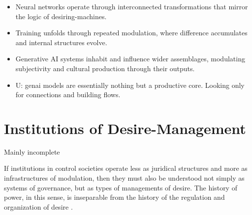 \begin{orangebox}
	\begin{itemize}
		\item Neural networks operate through interconnected transformations that mirror the logic of desiring-machines.
		\item Training unfolds through repeated modulation, where difference accumulates and internal structures evolve.
		\item Generative AI systems inhabit and influence wider assemblages, modulating subjectivity and cultural production through their outputs.
		\item U: \gls{genai} models are essentially nothing but a productive core.
		      Looking only for connections and building flows.
	\end{itemize}
\end{orangebox}




\section{Institutions of Desire-Management}\label{sec:desiring-institutions}
\begin{orangebox}
	Mainly incomplete
\end{orangebox}





If institutions in control societies operate less as juridical structures and more as infrastructures of modulation, then they must also be understood not simply as systems of governance, but as types of managements of desire. The history of power, in this sense, is inseparable from the history of the regulation and organization of desire \parencite[139-145]{deleuze1983} .

